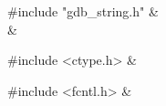 \medskip
\begin{cxreftabi}
{\stt \#include "gdb\_string.h"} &\\
\hspace*{0.2in}{\stt \#include <string.h>} &\\
\end{cxreftabi}

\medskip
\begin{cxreftabi}
{\stt \#include <ctype.h>} &\\
\end{cxreftabi}

\medskip
\begin{cxreftabi}
{\stt \#include <fcntl.h>} &\\
\end{cxreftabi}

\medskip
